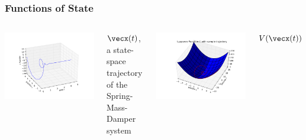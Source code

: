 \documentclass[12pt]{beamer}
\begin{document}
\begin{frame}
\frametitle{Functions of State}

\begin{columns}
\centering
\includegraphics[width=\linewidth]{smd_trajectory}

$\vecx(t)$, a state-space trajectory of the Spring-Mass-Damper system

\centering
\includegraphics[width=1\linewidth]{smd_Vtraj}

$V(\vecx(t))$

\end{columns}

\end{frame}
\end{document}
